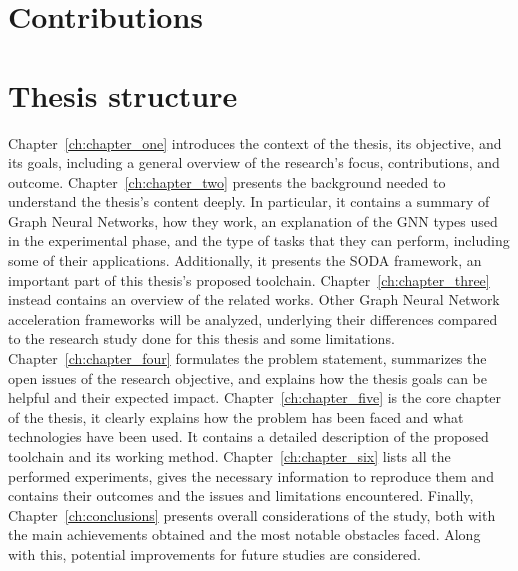 \documentclass{Configuration_Files/PoliMi3i_thesis}
\begin{document}
    \section{Contributions}
    \label{sec:contributions}%


    \section{Thesis structure}
    \label{sec:thesis_structure}%

    Chapter~\ref{ch:chapter_one} introduces the context of the thesis, its objective, and its goals, including a general overview of the research's focus, contributions, and outcome.
    Chapter~\ref{ch:chapter_two} presents the background needed to understand the thesis's content deeply.
    In particular, it contains a summary of Graph Neural Networks, how they work, an explanation of the GNN types used in the experimental phase, and the type of tasks that they can perform, including some of their applications.
    Additionally, it presents the SODA framework, an important part of this thesis's proposed toolchain.
    Chapter~\ref{ch:chapter_three} instead contains an overview of the related works.
    Other Graph Neural Network acceleration frameworks will be analyzed, underlying their differences compared to the research study done for this thesis and some limitations.
    Chapter~\ref{ch:chapter_four} formulates the problem statement, summarizes the open issues of the research objective, and explains how the thesis goals can be helpful and their expected impact.
    Chapter~\ref{ch:chapter_five} is the core chapter of the thesis, it clearly explains how the problem has been faced and what technologies have been used.
    It contains a detailed description of the proposed toolchain and its working method.
    Chapter~\ref{ch:chapter_six} lists all the performed experiments, gives the necessary information to reproduce them and contains their outcomes and the issues and limitations encountered.
    Finally, Chapter~\ref{ch:conclusions} presents overall considerations of the study, both with the main achievements obtained and the most notable obstacles faced.
    Along with this, potential improvements for future studies are considered.



\end{document}
